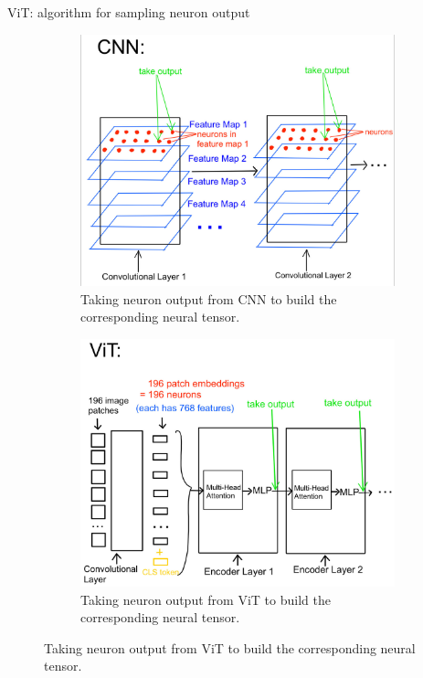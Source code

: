 \documentclass[xcolor={dvipsnames,svgnames}]{beamer}
\begin{document}
\begin{frame}{ViT: algorithm for sampling neuron output}
    \begin{figure}[H]
\centering
\begin{subfigure}[b]{0.45\textwidth}
    \includegraphics[width=\textwidth]{figures/artificial/cnn-tensor.jpg}
    \caption{Taking neuron output from CNN to build the corresponding neural tensor.}
\end{subfigure}
\hfill
\begin{subfigure}[b]{0.5\textwidth}
    \includegraphics[width=\textwidth]{figures/artificial/vit-tensor.jpg}
    \caption{Taking neuron output from ViT to build the corresponding neural tensor.}
\end{subfigure}
\end{figure} 
\end{frame}
\end{document}

